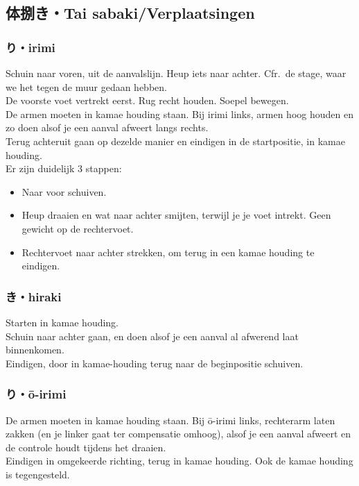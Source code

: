 \subsection{体捌き・Tai sabaki/Verplaatsingen}
\subsubsection{り・irimi}
Schuin naar voren, uit de aanvalslijn. Heup iets naar achter. Cfr.\ de stage, waar we het tegen de muur gedaan hebben.\\
De voorste voet vertrekt eerst. Rug recht houden. Soepel bewegen.\\
De armen moeten in kamae houding staan. Bij irimi links, armen hoog houden en zo doen alsof je een aanval afweert langs rechts.\\
Terug achteruit gaan op dezelde manier en eindigen in de startpositie, in kamae houding.\\
Er zijn duidelijk 3 stappen:
\begin{itemize}
\item Naar voor schuiven.
\item Heup draaien en wat naar achter smijten, terwijl je je voet intrekt. Geen gewicht op de rechtervoet.
\item Rechtervoet naar achter strekken, om terug in een kamae houding te eindigen.
\end{itemize}

\subsubsection{き・hiraki}
Starten in kamae houding.\\
Schuin naar achter gaan, en doen alsof je een aanval al afwerend laat binnenkomen.\\
Eindigen, door in kamae-houding terug naar de beginpositie schuiven.

\subsubsection{り・\={o}-irimi}
De armen moeten in kamae houding staan. Bij \={o}-irimi links, rechterarm laten zakken (en je linker gaat ter compensatie omhoog), alsof je een aanval afweert en de controle houdt tijdens het draaien.\\
Eindigen in omgekeerde richting, terug in kamae houding. Ook de kamae houding is tegengesteld.

